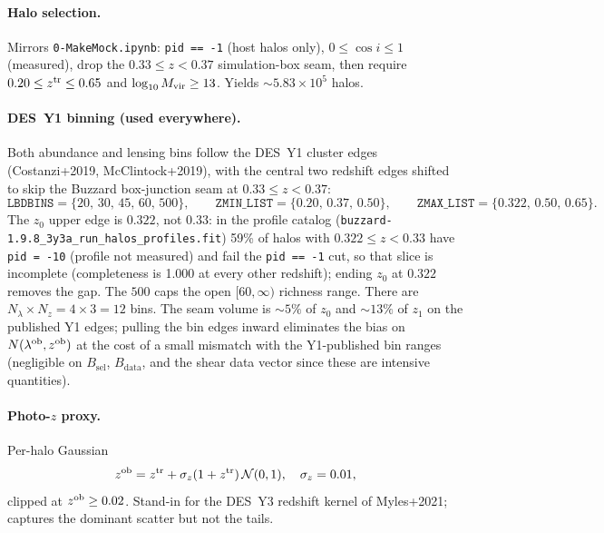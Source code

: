 \documentclass[a4paper, 11pt]{article}
\newcommand{\lob}{\lambda^{\rm ob}}
\newcommand{\zob}{z^{\rm ob}}
\newcommand{\ztr}{z^{\rm tr}}
\newcommand{\pyfile}[1]{{\small\texttt{#1}}}
\begin{document}
\paragraph{Halo selection.} Mirrors \pyfile{0-MakeMock.ipynb}:
\texttt{pid == -1} (host halos only), $0 \le \cos i \le 1$ (measured), drop
the $0.33 \le z < 0.37$ simulation-box seam, then require $0.20 \le \ztr
\le 0.65$ and $\log_{10} M_{\rm vir} \ge 13$. Yields $\sim 5.83 \times
10^5$ halos.

\paragraph{DES~Y1 binning (used everywhere).} Both abundance and lensing
bins follow the DES~Y1 cluster edges (Costanzi+2019, McClintock+2019),
with the central two redshift edges shifted to skip the Buzzard
box-junction seam at $0.33 \le z < 0.37$:
\begin{equation*}
  \texttt{LBDBINS}    = \{20,\, 30,\, 45,\, 60,\, 500\},\qquad
  \texttt{ZMIN\_LIST} = \{0.20,\, 0.37,\, 0.50\},\qquad
  \texttt{ZMAX\_LIST} = \{0.322,\, 0.50,\, 0.65\}.
\end{equation*}
The $z_0$ upper edge is $0.322$, not $0.33$: in the profile catalog
(\texttt{buzzard-1.9.8\_3y3a\_run\_halos\_profiles.fit}) 59\% of halos with
$0.322 \le z < 0.33$ have \texttt{pid = -10} (profile not measured) and fail
the \texttt{pid == -1} cut, so that slice is incomplete (completeness is
1.000 at every other redshift); ending $z_0$ at $0.322$ removes the gap.
The $500$ caps the open $[60, \infty)$ richness range. There are
$N_\lambda \times N_z = 4 \times 3 = 12$ bins. The seam volume is
$\sim 5\%$ of $z_0$ and $\sim 13\%$ of $z_1$ on the published Y1
edges; pulling the bin edges inward eliminates the bias on $N(\lob,
\zob)$ at the cost of a small mismatch with the Y1-published bin
ranges (negligible on $B_\mathrm{sel}$, $B_\mathrm{data}$, and the
shear data vector since these are intensive quantities).

\paragraph{Photo-$z$ proxy.} Per-halo Gaussian
\begin{equation}
  \zob = \ztr + \sigma_z(1 + \ztr)\,\mathcal N(0, 1),\quad \sigma_z = 0.01,
  \label{eq:photoz-proxy}
\end{equation}
clipped at $\zob \ge 0.02$. Stand-in for the DES~Y3 redshift kernel of
Myles+2021; captures the dominant scatter but not the tails.
\end{document}
